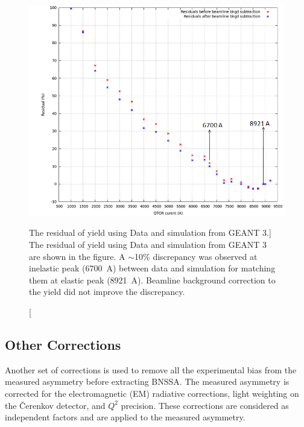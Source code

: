 \begin{figure}[!h]
	\begin{center}
	\includegraphics[width=15.0cm]{figures/elasticDilutionDiscrepancy}
	\end{center}
	\caption
	[The residual of yield using Data and simulation from GEANT 3.]
	{The residual of yield using Data and simulation from GEANT 3~\cite{elog:adesh_analysis837} are shown in the figure. A $\sim$10\% discrepancy was observed at inelastic peak (6700~A) between data and simulation for matching them at elastic peak (8921~A). Beamline background correction to the yield did not improve the discrepancy. }
	\label{fig:elasticDilutionDiscrepancy}
\end{figure}


\subsection{Other Corrections}
\label{Other Corrections}
Another set of corrections is used to remove all the experimental bias from the measured asymmetry before extracting BNSSA. The measured asymmetry is corrected for the electromagnetic (EM) radiative corrections, light weighting on the \v{C}erenkov detector, and $Q^{2}$ precision. These corrections are considered as independent factors and are applied to the measured asymmetry.

